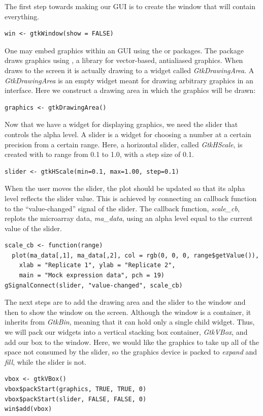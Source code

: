 \documentclass[article]{jss}
\begin{document}
The first step towards making our GUI is to create the window that
will contain everything. 
\begin{verbatim}
win <- gtkWindow(show = FALSE)
\end{verbatim}

One may embed  graphics within an  GUI using the 
 \citep{cairoDevice} or  \citep{gtkDevice}
packages. The  package draws  graphics using 
 \citep{cairo}, a library for vector-based, antialiased graphics.
When  draws to the screen it is actually drawing to a 
 widget called \emph{GtkDrawingArea}. A \emph{GtkDrawingArea}
is an empty widget meant for drawing arbitrary graphics in an interface. Here we 
construct a drawing area in which the  graphics will be drawn:
\begin{verbatim}
graphics <- gtkDrawingArea()
\end{verbatim}

Now that we have a widget for displaying  graphics, we need the slider
that controls the alpha level. A slider is a widget for choosing a number
at a certain precision from a certain range. Here, a horizontal slider, called
\emph{GtkHScale}, is created with to range from 0.1 to 1.0, with a step size of 0.1.
\begin{verbatim}
slider <- gtkHScale(min=0.1, max=1.00, step=0.1)
\end{verbatim}

When the user moves the slider, the plot should be updated so that its alpha
level reflects the slider value. This is achieved by connecting
an  callback function to the ``value-changed'' signal of the slider. 
The callback function, \emph{scale\_cb}, replots the microarray data, \emph{ma\_data}, using
an alpha level equal to the current value of the slider. 
\begin{verbatim}
scale_cb <- function(range) 
  plot(ma_data[,1], ma_data[,2], col = rgb(0, 0, 0, range$getValue()),
    xlab = "Replicate 1", ylab = "Replicate 2", 
    main = "Mock expression data", pch = 19)
gSignalConnect(slider, "value-changed", scale_cb)
\end{verbatim}

The next steps are to add the drawing area and the slider to the
window and then to show the window on the screen. Although the window is a
container, it inherits from \emph{GtkBin}, meaning that it can hold only
a single child widget. Thus, we will pack our widgets into a vertical stacking 
box container, \emph{GtkVBox}, and add our box to the window.
Here, we would like the graphics to take up all of the space not consumed by the
slider, so the graphics device is packed to \emph{expand} and \emph{fill}, while
the slider is not.
\begin{verbatim}
vbox <- gtkVBox()
vbox$packStart(graphics, TRUE, TRUE, 0)
vbox$packStart(slider, FALSE, FALSE, 0)
win$add(vbox)
\end{verbatim}
\end{document}
